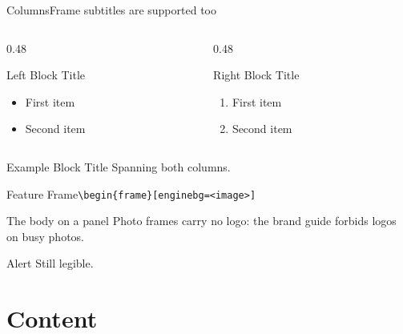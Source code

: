 \documentclass[aspectratio=\engineaspectratio]{beamer}
\begin{document}
\begin{frame}[t]{Columns}{Frame subtitles are supported too}
  \begin{columns}[t]
    \begin{column}{0.48\textwidth}
      \begin{block}{Left Block Title}
        \begin{itemize}
        \item First item
        \item Second item
        \end{itemize}
      \end{block}
    \end{column}
    \begin{column}{0.48\textwidth}
      \begin{block}{Right Block Title}
        \begin{enumerate}
        \item First item
        \item Second item
        \end{enumerate}
      \end{block}
    \end{column}
  \end{columns}
  \begin{exampleblock}{Example Block Title}
    Spanning both columns.
  \end{exampleblock}
\end{frame}

\begin{frame}[enginebg=images/wallpaper/mesa_lab.jpg]{Feature Frame}{\texttt{\textbackslash begin\{frame\}[enginebg=<image>]}}
  \begin{enginefeaturepanel}
    \begin{block}{The body on a panel}
      Photo frames carry no logo: the brand guide forbids logos on busy photos.
    \end{block}
    \begin{alertblock}{Alert}
      Still legible.
    \end{alertblock}
  \end{enginefeaturepanel}
\end{frame}

\section{Content}
\end{document}
